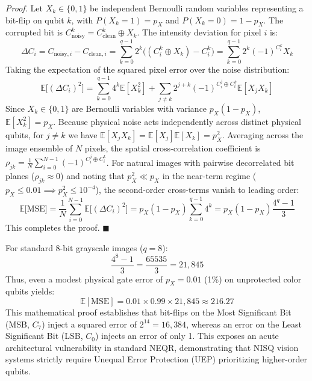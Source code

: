 \documentclass[12pt,onecolumn,draftclsnofoot]{IEEEtran}
\begin{document}
\noindent\textit{Proof.} Let $X_k \in \{0, 1\}$ be independent Bernoulli random variables representing a bit-flip on qubit $k$, with $P(X_k = 1) = p_X$ and $P(X_k = 0) = 1 - p_X$. The corrupted bit is $C_{\text{noisy}}^k = C_{\text{clean}}^k \oplus X_k$. The intensity deviation for pixel $i$ is:
\begin{equation}
\Delta C_i = C_{\text{noisy}, i} - C_{\text{clean}, i} = \sum_{k=0}^{q-1} 2^k \Big( (C_{i}^k \oplus X_k) - C_{i}^k \Big) = \sum_{k=0}^{q-1} 2^k (-1)^{C_{i}^k} X_k
\end{equation}
Taking the expectation of the squared pixel error over the noise distribution:
\begin{equation}
\mathbb{E}\big[(\Delta C_i)^2\big] = \sum_{k=0}^{q-1} 4^k \mathbb{E}[X_k^2] + \sum_{j \ne k} 2^{j+k} (-1)^{C_{i}^j \oplus C_{i}^k} \mathbb{E}[X_j X_k]
\end{equation}
Since $X_k \in \{0, 1\}$ are Bernoulli variables with variance $p_X(1-p_X)$, $\mathbb{E}[X_k^2] = p_X$. Because physical noise acts independently across distinct physical qubits, for $j \ne k$ we have $\mathbb{E}[X_j X_k] = \mathbb{E}[X_j]\mathbb{E}[X_k] = p_X^2$. Averaging across the image ensemble of $N$ pixels, the spatial cross-correlation coefficient is $\rho_{jk} = \frac{1}{N} \sum_{i=0}^{N-1} (-1)^{C_i^j \oplus C_i^k}$. For natural images with pairwise decorrelated bit planes ($\rho_{jk} \approx 0$) and noting that $p_X^2 \ll p_X$ in the near-term regime ($p_X \le 0.01 \implies p_X^2 \le 10^{-4}$), the second-order cross-terms vanish to leading order:
\begin{equation}
\mathbb{E}\big[\text{MSE}\big] = \frac{1}{N}\sum_{i=0}^{N-1} \mathbb{E}\big[(\Delta C_i)^2\big] = p_X(1 - p_X) \sum_{k=0}^{q-1} 4^k = p_X(1 - p_X) \frac{4^q - 1}{3}
\end{equation}
This completes the proof. $\blacksquare$

For standard 8-bit grayscale images ($q=8$):
\begin{equation}
\frac{4^8 - 1}{3} = \frac{65535}{3} = 21,845
\end{equation}
Thus, even a modest physical gate error of $p_X = 0.01$ (1\%) on unprotected color qubits yields:
\begin{equation}
\mathbb{E}[\text{MSE}] = 0.01 \times 0.99 \times 21,845 \approx 216.27
\end{equation}
This mathematical proof establishes that bit-flips on the Most Significant Bit (MSB, $C_7$) inject a squared error of $2^{14} = 16,384$, whereas an error on the Least Significant Bit (LSB, $C_0$) injects an error of only 1. This exposes an acute architectural vulnerability in standard NEQR, demonstrating that NISQ vision systems strictly require Unequal Error Protection (UEP) prioritizing higher-order qubits.
\end{document}
